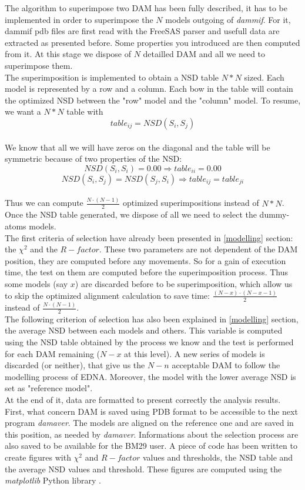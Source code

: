 \documentclass[a4paper, 11pt]{report}
\begin{document}
The algorithm to superimpose two DAM has been fully described, it has 
to be implemented in order to superimpose the $N$ models outgoing of 
\textit{dammif}. 
For it, dammif pdb files are first read with the FreeSAS parser and 
usefull data are extracted as presented before. 
Some properties you introduced are then computed from it. 
At this stage we dispose of $N$ detailled DAM and all we need to 
superimpose them.\\
The superimposition is implemented to obtain a NSD table $N*N$ sized. 
Each model is represented by a row and a column. 
Each bow in the table will contain the optimized NSD between the "row" 
model and the "column" model. 
To resume, we want a $N*N$ table with 
\[
table_{ij}=NSD(S_{i},S_{j})
\]\\ 
We know that all we will have zeros on the diagonal and the table will 
be symmetric because of two properties of the NSD:
\[
NSD(S_{i},S_{i})=0.00 \Rightarrow table_{ii}=0.00
\]
\[
NSD(S_{i},S_{j}) = NSD(S_{j},S_{i}) \Rightarrow table_{ij}=table_{ji}
\]\\
Thus we can compute $\frac{N \cdot (N-1)}{2}$ optimized 
superimpositions instead of $N*N$.\\

Once the NSD table generated, we dispose of all we need to select the 
dummy-atoms models.\\
The first criteria of selection have already been presented in 
\ref{modelling} section: the $\chi^2$ and the $R-factor$. 
These two parameters are not dependent of the DAM position, they are 
computed before any movements. 
So for a gain of execution time, the test on them are computed before 
the superimposition process. 
Thus some models (say $x$) are discarded before to be superimposition, 
which allow us to skip the optimized alignment calculation to save 
time: $\frac{(N-x) \cdot (N-x-1)}{2}$ instead of 
$\frac{N \cdot (N-1)}{2}$.\\
The following criterion of selection has also been explained in 
\ref{modelling} section, the average NSD between each models and 
others. 
This variable is computed using the NSD table obtained by the process 
we know and the test is performed for each DAM remaining ($N-x$ at 
this level). 
A new series of models is discarded (or neither), that give us the 
$N-n$ acceptable DAM to follow the modelling process of EDNA. 
Moreover, the model with the lower average NSD is set as "reference 
model".\\

At the end of it, data are formatted to present correctly the analysis 
results. 
First, what concern DAM is saved using PDB format to be accessible to 
the next program \textit{damaver}. 
The models are aligned on the reference one and are saved in this 
position, as needed by \textit{damaver}. 
Informations about the selection process are also saved to be 
available for the BM29 user. 
A piece of code has been written to create figures with $\chi^2$ and 
$R-factor$ values and thresholds, the NSD table and the average NSD 
values and threshold. 
These figures are computed using the \textit{matplotlib} Python 
library \cite{matplotlib}.
\end{document}
